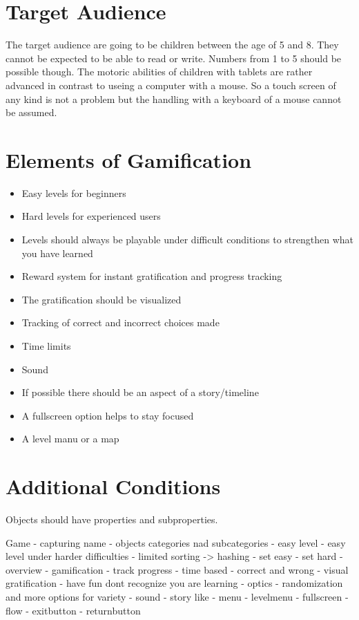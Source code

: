 \section{Target Audience}
The target audience are going to be children between the age of 5 and 8.
They cannot be expected to be able to read or write. Numbers from 1 to 5 should be possible though.
The motoric abilities of children with tablets are rather advanced in contrast to useing a computer with a mouse.
So a touch screen of any kind is not a problem but the handling with a keyboard of a mouse cannot be assumed.

\section{Elements of Gamification}
\begin{itemize}
    \item Easy levels for beginners
    \item Hard levels for experienced users
    \item Levels should always be playable under difficult conditions to strengthen what you have learned
    \item Reward system for instant gratification and progress tracking
    \item The gratification should be visualized
    \item Tracking of correct and incorrect choices made
    \item Time limits
    \item Sound
    \item If possible there should be an aspect of a story/timeline
    \item A fullscreen option helps to stay focused
    \item A level manu or a map
\end{itemize}
\section{Additional Conditions}


Objects should have properties and subproperties.

Game
- capturing name
- objects categories nad subcategories
- easy level
- easy level under harder difficulties
- limited sorting -> hashing
- set easy
- set hard
- overview
- gamification
    - track progress
        - time based
        - correct and wrong
        - visual gratification
    - have fun dont recognize you are learning
        - optics
            - randomization and more options for variety
        - sound
        - story like
    - menu
    - levelmenu
    - fullscreen
    - flow
        - exitbutton
        - returnbutton
